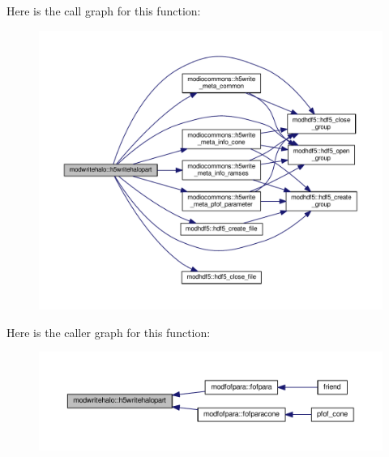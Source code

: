 Here is the call graph for this function\-:\nopagebreak
\begin{figure}[H]
\begin{center}
\leavevmode
\includegraphics[width=350pt]{classmodwritehalo_afd37f5189cf5f5ebe43de6b2c0959258_cgraph}
\end{center}
\end{figure}




Here is the caller graph for this function\-:\nopagebreak
\begin{figure}[H]
\begin{center}
\leavevmode
\includegraphics[width=350pt]{classmodwritehalo_afd37f5189cf5f5ebe43de6b2c0959258_icgraph}
\end{center}
\end{figure}


